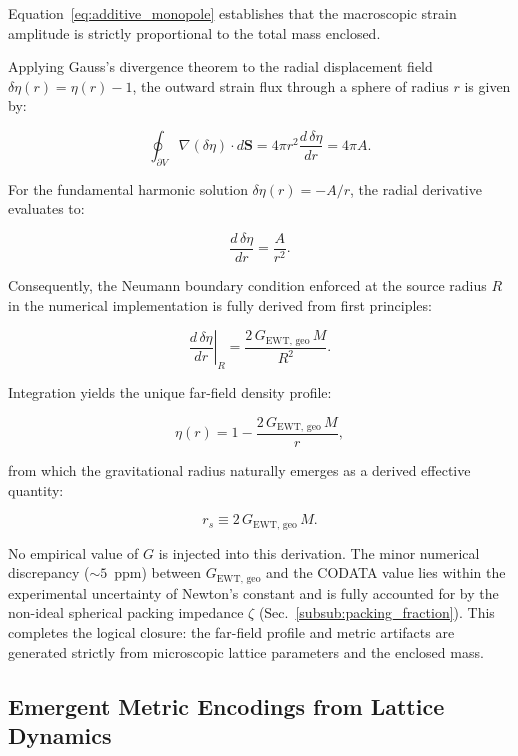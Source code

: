 \documentclass[10pt,a4paper]{article}
\begin{document}
Equation~\eqref{eq:additive_monopole} establishes that the macroscopic strain amplitude is strictly proportional to the total mass enclosed.

Applying Gauss's divergence theorem to the radial displacement field \(\delta\eta(r) = \eta(r) - 1\), the outward strain flux through a sphere of radius \(r\) is given by:

\begin{equation}
	\oint_{\partial V} \nabla (\delta\eta) \cdot d\mathbf{S} = 4\pi r^2 \frac{d\,\delta\eta}{dr} = 4\pi A .
\end{equation}

For the fundamental harmonic solution \(\delta\eta(r) = -A/r\), the radial derivative evaluates to:

\begin{equation}
	\frac{d\,\delta\eta}{dr} = \frac{A}{r^2} .
\end{equation}

Consequently, the Neumann boundary condition enforced at the source radius \(R\) in the numerical implementation is fully derived from first principles:

\begin{equation}
	\left.\frac{d\,\delta\eta}{dr}\right|_{R} = \frac{2\,G_{\text{EWT, geo}}\,M}{R^2} .
\end{equation}

Integration yields the unique far-field density profile:

\begin{equation}
	\eta(r) = 1 - \frac{2\,G_{\text{EWT, geo}}\,M}{r} ,
\end{equation}

from which the gravitational radius naturally emerges as a derived effective quantity:

\begin{equation}
	r_s \equiv 2\,G_{\text{EWT, geo}}\,M .
\end{equation}

No empirical value of \(G\) is injected into this derivation. The minor numerical discrepancy ($\sim 5$~ppm) between \(G_{\text{EWT, geo}}\) and the CODATA value lies within the experimental uncertainty of Newton's constant and is fully accounted for by the non-ideal spherical packing impedance \(\zeta\) (Sec.~\ref{subsub:packing_fraction}). This completes the logical closure: the far-field profile and metric artifacts are generated strictly from microscopic lattice parameters and the enclosed mass.


\subsection{Emergent Metric Encodings from Lattice Dynamics}
\label{sec:emergent_metric_encodings}
\end{document}
